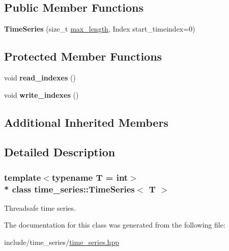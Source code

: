 \subsection*{Public Member Functions}
\begin{DoxyCompactItemize}
\item 
{\bfseries Time\+Series} (size\+\_\+t \hyperlink{classtime__series_1_1internal_1_1TimeSeriesBase_aee1bf636a094a3068f9de731688c3972}{max\+\_\+length}, Index start\+\_\+timeindex=0)\hypertarget{classtime__series_1_1TimeSeries_abd15b59569dc3dca7d1b848a0867a117}{}\label{classtime__series_1_1TimeSeries_abd15b59569dc3dca7d1b848a0867a117}

\end{DoxyCompactItemize}
\subsection*{Protected Member Functions}
\begin{DoxyCompactItemize}
\item 
void {\bfseries read\+\_\+indexes} ()\hypertarget{classtime__series_1_1TimeSeries_acbd2aa3299e5c62811df429896791767}{}\label{classtime__series_1_1TimeSeries_acbd2aa3299e5c62811df429896791767}

\item 
void {\bfseries write\+\_\+indexes} ()\hypertarget{classtime__series_1_1TimeSeries_a0fdedf27b55bbf78eed4d35f82cf3ace}{}\label{classtime__series_1_1TimeSeries_a0fdedf27b55bbf78eed4d35f82cf3ace}

\end{DoxyCompactItemize}
\subsection*{Additional Inherited Members}


\subsection{Detailed Description}
\subsubsection*{template$<$typename T = int$>$\\*
class time\+\_\+series\+::\+Time\+Series$<$ T $>$}

Threadsafe time series. 

The documentation for this class was generated from the following file\+:\begin{DoxyCompactItemize}
\item 
include/time\+\_\+series/\hyperlink{time__series_8hpp}{time\+\_\+series.\+hpp}\end{DoxyCompactItemize}

